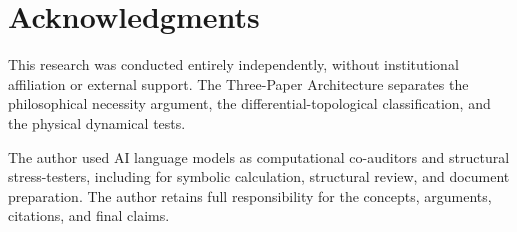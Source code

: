 \documentclass[11pt]{article}
\theoremstyle{canonstyle}
\begin{document}
\section*{Acknowledgments}

This research was conducted entirely independently, without institutional affiliation or external support. The Three-Paper Architecture separates the philosophical necessity argument, the differential-topological classification, and the physical dynamical tests.

The author used AI language models as computational co-auditors and structural stress-testers, including for symbolic calculation, structural review, and document preparation. The author retains full responsibility for the concepts, arguments, citations, and final claims.

\newpage
{}
{}
\end{document}
